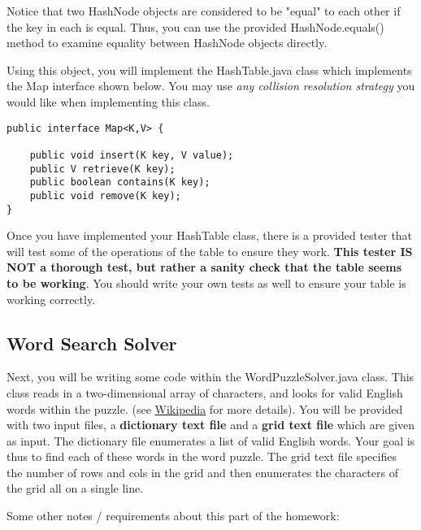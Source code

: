 \documentclass[paper=a4, fontsize=11pt, parskip=full]{scrartcl} %
\numberwithin{equation}{section} %
\numberwithin{figure}{section} %
\numberwithin{table}{section} %
\begin{document}
Notice that two HashNode objects are considered to be "equal" to each other if the key in each is equal. Thus, you can use the provided HashNode.equals() method to examine equality between HashNode objects directly.

Using this object, you will implement the HashTable.java class which implements the Map interface shown below. You may use \emph{any collision resolution strategy} you would like when implementing this class. 

\begin{lstlisting}
public interface Map<K,V> {

	public void insert(K key, V value);
	public V retrieve(K key);
	public boolean contains(K key);
	public void remove(K key);
}
\end{lstlisting}

Once you have implemented your HashTable class, there is a provided tester that will test some of the operations of the table to ensure they work. \textbf{This tester IS NOT a thorough test, but rather a sanity check that the table seems to be working}. You should write your own tests as well to ensure your table is working correctly.

\subsection{Word Search Solver}

Next, you will be writing some code within the WordPuzzleSolver.java class. This class reads in a two-dimensional array of characters, and looks for valid English words within the puzzle. (see \href{https://en.wikipedia.org/wiki/Word_search}{Wikipedia} for more details). You will be provided with two input files, a \textbf{dictionary text file} and a \textbf{grid text file} which are given as input. The dictionary file enumerates a list of valid English words. Your goal is thus to find each of these words in the word puzzle. The grid text file specifies the number of rows and cols in the grid and then enumerates the characters of the grid all on a single line.

Some other notes / requirements about this part of the homework:
\end{document}
